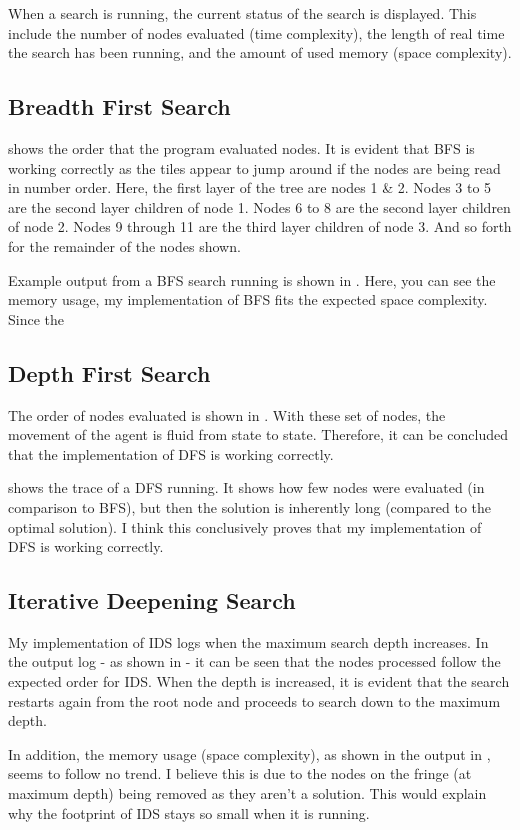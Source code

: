 \documentclass[a4paper]{article}
\begin{document}
When a search is running, the current status of the search is displayed.
This include the number of nodes evaluated (time complexity), the length of real time the search has been running, and the amount of used memory (space complexity).

\subsection{Breadth First Search}
 shows the order that the program evaluated nodes.
It is evident that BFS is working correctly as the tiles appear to jump around if the nodes are being read in number order.
Here, the first layer of the tree are nodes 1 \& 2.
Nodes 3 to 5 are the second layer children of node 1.
Nodes 6 to 8 are the second layer children of node 2.
Nodes 9 through 11 are the third layer children of node 3.
And so forth for the remainder of the nodes shown.

Example output from a BFS search running is shown in .
Here, you can see the memory usage, my implementation of BFS fits the expected space complexity.
Since the

\subsection{Depth First Search}
The order of nodes evaluated is shown in .
With these set of nodes, the movement of the agent is fluid from state to state.
Therefore, it can be concluded that the implementation of DFS is working correctly.

 shows the trace of a DFS running.
It shows how few nodes were evaluated (in comparison to BFS), but then the solution is inherently long (compared to the optimal solution).
I think this conclusively proves that my implementation of DFS is working correctly.

\subsection{Iterative Deepening Search}
My implementation of IDS logs when the maximum search depth increases.
In the output log - as shown in  - it can be seen that the nodes processed follow the expected order for IDS.
When the depth is increased, it is evident that the search restarts again from the root node and proceeds to search down to the maximum depth.

In addition, the memory usage (space complexity), as shown in the output in , seems to follow no trend.
I believe this is due to the nodes on the fringe (at maximum depth) being removed as they aren't a solution.
This would explain why the footprint of IDS stays so small when it is running.
\end{document}
